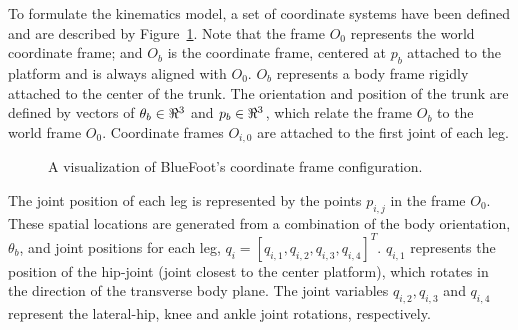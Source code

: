 			To formulate the kinematics model, a set of coordinate systems have been defined and are described by Figure~\ref{fig::coordinate_frames}. Note that the frame $O_{0}$ represents the world coordinate frame; and $O_{b}$ is the coordinate frame, centered at  ${p}_{b}$ attached to the platform and is always aligned with $O_{0}$. $O_{b}$ represents a body frame rigidly attached to the center of the trunk. The orientation and position of the trunk are defined by vectors of $\theta_{b}\in\Re^{3}$ and ${p}_{b}\in\Re^{3}$, which relate the frame $O_{b}$ to the world frame $O_{0}$. Coordinate frames $O_{i,0}$ are attached to the first joint of each \Ith leg.
%
				\begin{figure}[h!]
					\centering
					\caption{A visualization of BlueFoot's coordinate frame configuration.}
					\label{fig::coordinate_frames}
				\end{figure}
%
			The \Jth joint position of each \Ith leg is represented  by the points ${p}_{i,j}$ in the frame $O_{0}$. These spatial locations are generated from a combination of the body orientation, $\theta_{b}$, and joint positions for each \Ith leg, $q_{i} = [q_{i,1}, q_{i,2}, q_{i,3}, q_{i,4}]^T$. $q_{i,1}$ represents the position of the hip-joint (joint closest to the center platform), which rotates in the direction of the transverse body plane. The joint variables $q_{i,2}, q_{i,3}$ and $q_{i,4}$ represent the lateral-hip, knee and ankle joint rotations, respectively.

